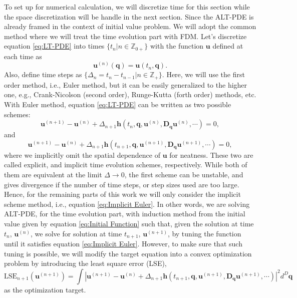 \documentclass[preprint, 12pt]{revtex4-2}
\numberwithin{equation}{section}
\begin{document}
To set up for numerical calculation, we will discretize time for this section while the space discretization will be handle in the next section. Since the ALT-PDE is already framed in the context of initial value problem. We will adopt the common method where we will treat the time evolution part with FDM. Let's discretize equation \ref{eq:LT-PDE} into times $\{t_n|n\in\mathbb{Z}_{0+}\}$ with the function $\mathbf{u}$ defined at each time as
\begin{equation}\label{eq:Discretized Function}
    \mathbf{u}^{(n)}(\mathbf{q}) = \mathbf{u}(t_n, \mathbf{q}).
\end{equation} 
Also, define time steps as $\{\Delta_n=t_n-t_{n-1}|n\in\mathbb{Z}_{+}\}$. Here, we will use the first order method, i.e., Euler method, but it can be easily generalized to the higher one, e.g., Crank-Nicolson (second order), Runge-Kutta (forth order) methods, etc. With Euler method, equation \ref{eq:LT-PDE} can be written as two possible schemes:
\begin{equation}\label{eq:Explicit Euler}
    \mathbf{u}^{(n+1)} - \mathbf{u}^{(n)} + \Delta_{n+1}\mathbf{h}(t_{n}, \mathbf{q}, \mathbf{u}^{(n)}, \mathbf{D}_\mathbf{q}\mathbf{u}^{(n)}, \cdots) = 0,
\end{equation}
and
\begin{equation}\label{eq:Implicit Euler}
    \mathbf{u}^{(n+1)} - \mathbf{u}^{(n)} + \Delta_{n+1}\mathbf{h}(t_{n+1}, \mathbf{q}, \mathbf{u}^{(n+1)}, \mathbf{D}_\mathbf{q}\mathbf{u}^{(n+1)}, \cdots) = 0,
\end{equation}
where we implicitly omit the spatial dependence of $\mathbf{u}$ for neatness. These two are called explicit, and implicit time evolution schemes, respectively. While both of them are equivalent at the limit $\Delta\rightarrow0$, the first scheme can be unstable, and gives divergence if the number of time steps, or step sizes used are too large. Hence, for the remaining parts of this work we will only consider the implicit scheme method, i.e., equation \ref{eq:Implicit Euler}. In other words, we are solving ALT-PDE, for the time evolution part, with induction method from the initial value given by equation \ref{eq:Initial Function} such that, given the solution at time $t_n$, $\mathbf{u}^{(n)}$, we solve for solution at time $t_{n+1}$, $\mathbf{u}^{(n+1)}$, by tuning the function until it satisfies equation \ref{eq:Implicit Euler}. However, to make sure that such tuning is possible, we will modify the target equation into a convex optimization problem by introducing the least square error (LSE), 
\begin{equation}\label{eq:LSE}
    \text{LSE}_{n+1}(\mathbf{u}^{(n+1)}) = \int \left|\mathbf{u}^{(n+1)} - \mathbf{u}^{(n)} + \Delta_{n+1}\mathbf{h}(t_{n+1}, \mathbf{q}, \mathbf{u}^{(n+1)}, \mathbf{D}_\mathbf{q}\mathbf{u}^{(n+1)}, \cdots)\right|^2 d^D\mathbf{q}
\end{equation}
as the optimization target.
\end{document}
